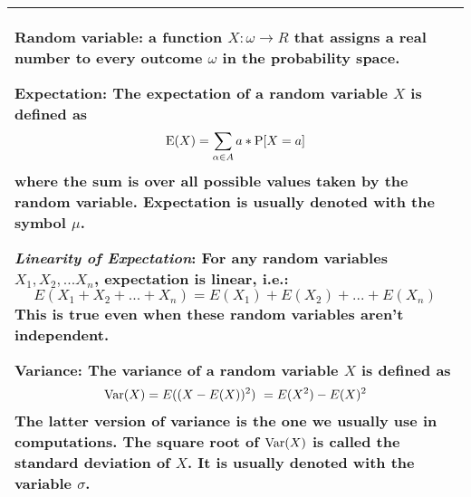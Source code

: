 {\tabulinesep=1mm
\begin{tabu}{|p{16cm} |}

\hline

\textbf{Random variable}: a function $X : \omega \rightarrow R$ 
that assigns a real number to every outcome $\omega$ in the probability space.

\vspace{6mm}


\textbf{Expectation}: The expectation of a random variable $X$ is defined as
$$\text{E}(X) = \sum_{\alpha \in A}a * \text{P}[X = a]$$ where the sum is over all possible values taken by the random variable. Expectation is usually denoted with the symbol $\mu$.

\vspace{2mm}

\textit{Linearity of Expectation}: For any random variables $X_1, X_2, ... X_n$, expectation is linear, i.e.:
$$E(X_1 + X_2 + ... + X_n) = E(X_1) + E(X_2) + ... + E(X_n)$$
This is true even when these random variables aren't independent.

\vspace{6mm}


\textbf{Variance}: The variance of a random variable $X$ is defined as $$\text{Var}(X) = E((X - E(X))^2)\ = E(X^2) - E(X)^2$$ The latter version of variance is the one we usually use in computations.
The square root of $\text{Var}(X)$ is called the standard deviation of $X$. It is usually denoted with the variable $\sigma$. 

\\
\hline
\end{tabu}

}
